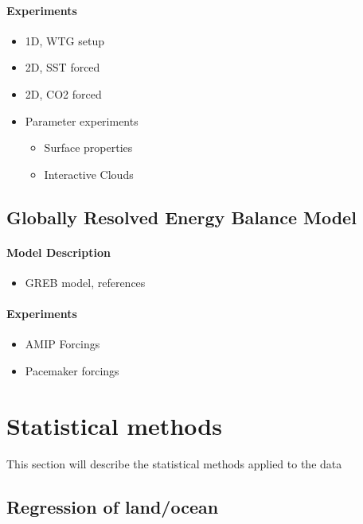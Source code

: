 \paragraph{Experiments}
\begin{itemize}
	\item 1D, WTG setup
	\item 2D, SST forced
	\item 2D, CO2 forced
	\item Parameter experiments
\begin{itemize}
	\item Surface properties
	\item Interactive Clouds
\end{itemize}
\end{itemize}


\subsection{Globally Resolved Energy Balance Model}

\paragraph{Model Description}
\begin{itemize}
	\item GREB model, references
\end{itemize}


\paragraph{Experiments}
\begin{itemize}
	\item AMIP Forcings
	\item Pacemaker forcings
\end{itemize}


\section{Statistical methods}

This section will describe the statistical methods applied to the data


\subsection{Regression of land/ocean}\label{ssec:rlo}


